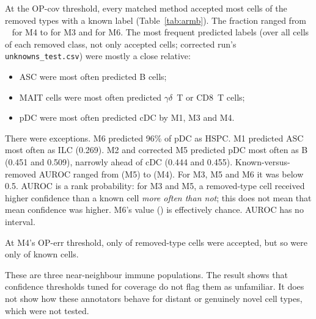 \documentclass[11pt]{article}
\newcommand{\gd}{$\gamma\delta$~T}
\begin{document}
At the OP-cov threshold, every matched method accepted most cells of the removed types with a known label (Table~\ref{tab:armb}). The fraction ranged from ~ for M4 to  for M3 and  for M6. The most frequent predicted labels (over all cells of each removed class, not only accepted cells; corrected run's \nolinkurl{unknowns_test.csv}) were mostly a close relative:
\begin{itemize}
\item ASC were most often predicted B cells;
\item MAIT cells were most often predicted \gd{} or CD8~T cells;
\item pDC were most often predicted cDC by M1, M3 and M4.
\end{itemize}
There were exceptions. M6 predicted 96\% of pDC as HSPC. M1 predicted ASC most often as ILC (0.269). M2 and corrected M5 predicted pDC most often as B (0.451 and 0.509), narrowly ahead of cDC (0.444 and 0.455). Known-versus-removed AUROC ranged from  (M5) to  (M4). For M3, M5 and M6 it was below 0.5. AUROC is a rank probability: for M3 and M5, a removed-type cell received higher confidence than a known cell \emph{more often than not}; this does not mean that mean confidence was higher. M6's value () is effectively chance. AUROC has no interval.

At M4's OP-err threshold, only  of removed-type cells were accepted, but so were only  of known cells.

These are three near-neighbour immune populations. The result shows that confidence thresholds tuned for coverage do not flag them as unfamiliar. It does not show how these annotators behave for distant or genuinely novel cell types, which were not tested.
\end{document}
